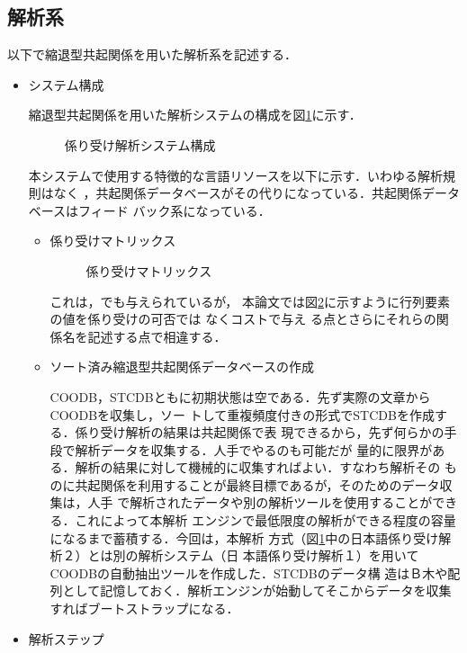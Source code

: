 \subsection{解析系}
\label{ana-sys}

以下で縮退型共起関係を用いた解析系を記述する．
\begin{itemize}
\item[(1)] システム構成

縮退型共起関係を用いた解析システムの構成を図\ref{システム構成}に示す．

\begin{figure} [htb]
\begin{center}
\caption{係り受け解析システム構成}
\label{システム構成}
\end{center}
\end{figure}

本システムで使用する特徴的な言語リソースを以下に示す．いわゆる解析規則はなく
，共起関係データベースがその代りになっている．共起関係データベースはフィード
バック系になっている．

\clearpage

\begin{itemize}
\item[(a)] 係り受けマトリックス

\begin{figure} [htb]
\begin{center}
\caption{係り受けマトリックス}
\label{マトリックス}
\end{center}
\end{figure}
\vspace*{-2mm}

これは，\cite{Yoshida1972}でも与えられているが，
本論文では図\ref{マトリックス}に示すように行列要素の値を係り受けの可否では
なくコストで与え
る点とさらにそれらの関係名を記述する点で相違する．

\item[(b)]ソート済み縮退型共起関係データベースの作成

COODB，STCDBともに初期状態は空である．先ず実際の文章からCOODBを収集し，ソー
トして重複頻度付きの形式でSTCDBを作成する．係り受け解析の結果は共起関係で表
現できるから，先ず何らかの手段で解析データを収集する．人手でやるのも可能だが
量的に限界がある．解析の結果に対して機械的に収集すればよい．すなわち解析その
ものに共起関係を利用することが最終目標であるが，そのためのデータ収集は，人手
で解析されたデータや別の解析ツールを使用することができる．これによって本解析
エンジンで最低限度の解析ができる程度の容量になるまで蓄積する．今回は，本解析
方式（図\ref{システム構成}中の日本語係り受け解析２）とは別の解析システム（日
本語係り受け解析１）を用いてCOODBの自動抽出ツールを作成した．STCDBのデータ構
造はＢ木や配列として記憶しておく．解析エンジンが始動してそこからデータを収集
すればブートストラップになる．
\end{itemize}
\item[(2)]解析ステップ


\end{itemize}
